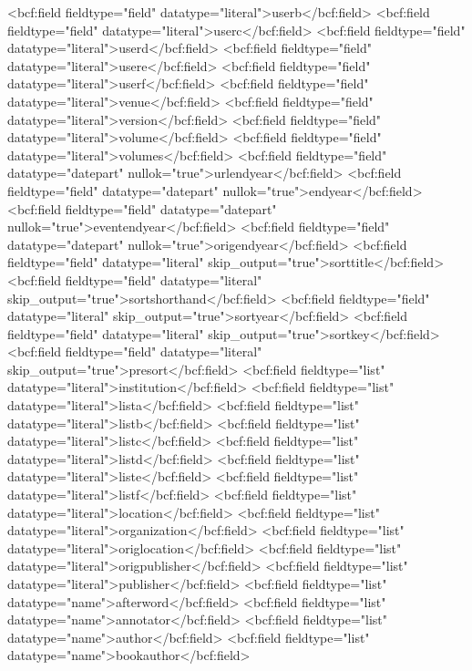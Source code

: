       <bcf:field fieldtype="field" datatype="literal">userb</bcf:field>
      <bcf:field fieldtype="field" datatype="literal">userc</bcf:field>
      <bcf:field fieldtype="field" datatype="literal">userd</bcf:field>
      <bcf:field fieldtype="field" datatype="literal">usere</bcf:field>
      <bcf:field fieldtype="field" datatype="literal">userf</bcf:field>
      <bcf:field fieldtype="field" datatype="literal">venue</bcf:field>
      <bcf:field fieldtype="field" datatype="literal">version</bcf:field>
      <bcf:field fieldtype="field" datatype="literal">volume</bcf:field>
      <bcf:field fieldtype="field" datatype="literal">volumes</bcf:field>
      <bcf:field fieldtype="field" datatype="datepart" nullok="true">urlendyear</bcf:field>
      <bcf:field fieldtype="field" datatype="datepart" nullok="true">endyear</bcf:field>
      <bcf:field fieldtype="field" datatype="datepart" nullok="true">eventendyear</bcf:field>
      <bcf:field fieldtype="field" datatype="datepart" nullok="true">origendyear</bcf:field>
      <bcf:field fieldtype="field" datatype="literal" skip_output="true">sorttitle</bcf:field>
      <bcf:field fieldtype="field" datatype="literal" skip_output="true">sortshorthand</bcf:field>
      <bcf:field fieldtype="field" datatype="literal" skip_output="true">sortyear</bcf:field>
      <bcf:field fieldtype="field" datatype="literal" skip_output="true">sortkey</bcf:field>
      <bcf:field fieldtype="field" datatype="literal" skip_output="true">presort</bcf:field>
      <bcf:field fieldtype="list" datatype="literal">institution</bcf:field>
      <bcf:field fieldtype="list" datatype="literal">lista</bcf:field>
      <bcf:field fieldtype="list" datatype="literal">listb</bcf:field>
      <bcf:field fieldtype="list" datatype="literal">listc</bcf:field>
      <bcf:field fieldtype="list" datatype="literal">listd</bcf:field>
      <bcf:field fieldtype="list" datatype="literal">liste</bcf:field>
      <bcf:field fieldtype="list" datatype="literal">listf</bcf:field>
      <bcf:field fieldtype="list" datatype="literal">location</bcf:field>
      <bcf:field fieldtype="list" datatype="literal">organization</bcf:field>
      <bcf:field fieldtype="list" datatype="literal">origlocation</bcf:field>
      <bcf:field fieldtype="list" datatype="literal">origpublisher</bcf:field>
      <bcf:field fieldtype="list" datatype="literal">publisher</bcf:field>
      <bcf:field fieldtype="list" datatype="name">afterword</bcf:field>
      <bcf:field fieldtype="list" datatype="name">annotator</bcf:field>
      <bcf:field fieldtype="list" datatype="name">author</bcf:field>
      <bcf:field fieldtype="list" datatype="name">bookauthor</bcf:field>

